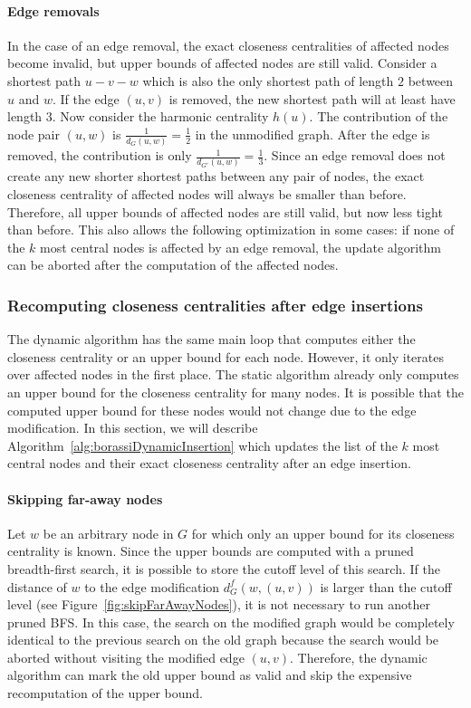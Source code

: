 \paragraph{Edge removals}
In the case of an edge removal, the exact closeness centralities of affected nodes become invalid, but upper bounds of affected nodes are still valid. Consider a shortest path $u - v - w$ which is also the only shortest path of length $2$ between $u$ and $w$. If the edge $(u, v)$ is removed, the new shortest path will at least have length $3$. Now consider the harmonic centrality $h(u)$. The contribution of the node pair $(u, w)$ is $\frac{1}{d_G(u, w)} = \frac{1}{2}$ in the unmodified graph. After the edge is removed, the contribution is only $\frac{1}{d_{G'}(u, w)} = \frac{1}{3}$. Since an edge removal does not create any new shorter shortest paths between any pair of nodes, the exact closeness centrality of affected nodes will always be smaller than before. Therefore, all upper bounds of affected nodes are still valid, but now less tight than before. This also allows the following optimization in some cases: if none of the $k$ most central nodes is affected by an edge removal, the update algorithm can be aborted after the computation of the affected nodes. 


\subsubsection{Recomputing closeness centralities after edge insertions}
\label{sec:dynamicComplexRecomputation}
The dynamic algorithm has the same main loop that computes either the closeness centrality or an upper bound for each node. However, it only iterates over affected nodes in the first place. The static algorithm already only computes an upper bound for the closeness centrality for many nodes. It is possible that the computed upper bound for these nodes would not change due to the edge modification. In this section, we will describe Algorithm~\ref{alg:borassiDynamicInsertion} which updates the list of the $k$ most central nodes and their exact closeness centrality after an edge insertion.

\paragraph{Skipping far-away nodes}
Let $w$ be an arbitrary node in $G$ for which only an upper bound for its closeness centrality is known. Since the upper bounds are computed with a pruned breadth-first search, it is possible to store the cutoff level of this search. If the distance of $w$ to the edge modification $d_G^f(w, (u, v))$ is larger than the cutoff level (see Figure~\ref{fig:skipFarAwayNodes}), it is not necessary to run another pruned BFS. In this case, the search on the modified graph would be completely identical to the previous search on the old graph because the search would be aborted without visiting the modified edge $(u, v)$. Therefore, the dynamic algorithm can mark the old upper bound as valid and skip the expensive recomputation of the upper bound.

